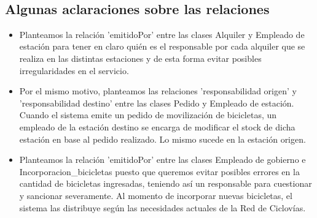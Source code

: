 ~



\subsection{Algunas aclaraciones sobre las relaciones}

\begin{itemize}
	\item Planteamos la relación 'emitidoPor' entre las clases Alquiler y Empleado de estación para tener en claro quién es el responsable por cada alquiler que se realiza en las distintas estaciones y de esta forma evitar posibles irregularidades en el servicio.
	\item Por el mismo motivo, planteamos las relaciones 'responsabilidad origen' y 'responsabilidad destino' entre las clases Pedido y Empleado de estación. Cuando el sistema emite un pedido de movilización de bicicletas, un empleado de la estación destino se encarga de modificar el stock de dicha estación en base al pedido realizado. Lo mismo sucede en la estación origen.
	\item Planteamos la relación 'emitidoPor' entre las clases Empleado de gobierno e Incorporacion\_bicicletas puesto que queremos evitar posibles errores en la cantidad de bicicletas ingresadas, teniendo así un responsable para cuestionar y sancionar severamente. Al momento de incorporar nuevas bicicletas, el sistema las distribuye según las necesidades actuales de la Red de Ciclovías. 
\end{itemize}




